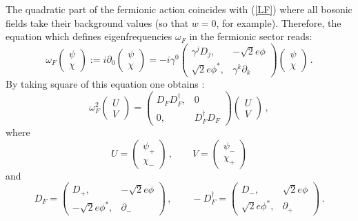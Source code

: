 \documentclass[a4paper,12pt]{article}
\begin{document}
The quadratic part of the fermionic action coincides with
(\ref{LF}) where all bosonic fields take their background values
(so that $w=0$, for example). Therefore, the equation which defines
eigenfrequencies $\omega_F$ in the fermionic sector reads:
\begin{equation}
\omega_F \left( \begin{array}{c} \psi \\ \chi \end{array} \right)
:=i\partial_0 
\left( \begin{array}{c} \psi \\ \chi \end{array} \right)
=-i\gamma^0 
\left( \begin{array}{cc} \gamma^j D_j ,& -\sqrt{2} e\phi \\
                         \sqrt{2} e\phi^* ,& \gamma^k \partial_k
\end{array} \right) 
\left( \begin{array}{c} \psi \\ \chi \end{array} \right) \,.
\label{Direq}
\end{equation}
By taking square of this equation one obtains \cite{Lee:1994pm}:
\begin{equation}
\omega_F^2 \left( \begin{array}{c} U \\ V \end{array} \right)
= \left( \begin{array}{cc} D_F D_F^\dag ,& 0 \\
                       0,& D_F^\dag D_F \end{array} \right)
\left( \begin{array}{c} U \\ V \end{array} \right) \,,
\label{sqDir}
\end{equation}
where
\begin{equation}
U=\left( \begin{array}{c} \psi_+ \\ \chi_- \end{array} \right)
\,,\qquad 
V=\left( \begin{array}{c} \psi_- \\ \chi_+ \end{array} \right)
\label{defUV}
\end{equation}
and
\begin{equation}
D_F = \left( \begin{array}{cc} D_+,& -\sqrt{2} e\phi \\
                           -\sqrt{2}e\phi^*,&\partial_-
\end{array}\right)\,,\qquad
-D_F^\dag = \left( \begin{array}{cc} D_-,& \sqrt{2} e\phi \\
                           \sqrt{2}e\phi^*,&\partial_+
\end{array}\right)\,.\label{DFDF}
\end{equation}
\end{document}
